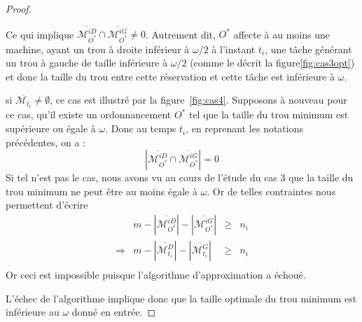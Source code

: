 \documentclass[a4paper,9pt]{article}
\begin{document}
\begin{proof}
\begin{bitemize}
\begin{enumerate}
                    Ce qui implique $\overline{\mathcal{M}_{O^*}^{iD}} \cap
                    \overline{\mathcal{M}_{O^*}^{iG}} \neq 0$. Autrement dit, $O^*$ affecte à au
                    moins une machine, ayant un trou à droite inférieur à $\omega / 2$ à l'instant
                    $t_i$, une tâche générant un trou à gauche de taille inférieure à $\omega / 2$
                    (comme le décrit la figure\ref{fig:cas3opt})
                    et donc la taille du trou entre cette réservation et cette tâche est inférieure à
                    $\omega$.
            \end{enumerate}
        \item si $\overline{\mathcal{M}_{t_i}} \neq \emptyset$, ce cas est illustré par la
            figure~\ref{fig:cas4}. Supposons à nouveau pour ce cas, qu'il existe un ordonnancement
            $O^*$ tel que la taille du trou minimum est supérieure ou égale à $\omega$. Donc au
            temps $t_i$, en reprenant les notations précédentes, on a :
            \begin{displaymath}
                |\overline{\mathcal{M}_{O^*}^{iD}} \cap \overline{\mathcal{M}_{O^*}^{iG}}| = 0
            \end{displaymath}
            Si tel n'est pas le cas, nous avons vu au cours de l'étude du cas $3$ que la taille
            du trou minimum ne peut être au moins égale à $\omega$. Or de telles contraintes nous
            permettent d'écrire
            \begin{displaymath}
                \begin{array}{rrcl}
                    & m - |\overline{\mathcal{M}_{O^*}^{iD}}| -
                    |\overline{\mathcal{M}_{O^*}^{iG}}| & \geq & n_i \\
                    \Rightarrow & m - |\overline{\mathcal{M}_{t_i}^D}| -
                    |\overline{\mathcal{M}_{t_i}^G}| & \geq & n_i \\
                \end{array}
            \end{displaymath}
            Or ceci est impossible puisque l'algorithme d'approximation a échoué.
    \end{bitemize}

    L'échec de l'algorithme implique donc que la taille optimale du trou minimum est inférieure au
    $\omega$ donné en entrée.
\end{proof}
\end{document}
